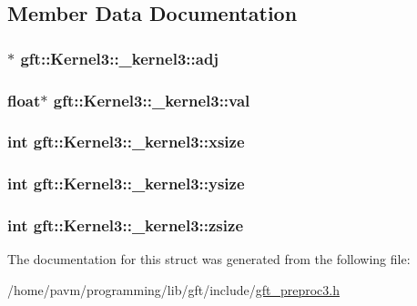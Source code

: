 \subsection{Member Data Documentation}
\hypertarget{structgft_1_1Kernel3_1_1__kernel3_aaca1908dcf4adcb6f2c248d950f89821}{
\subsubsection[{adj}]{$\ast$ gft\-::\-Kernel3\-::\-\_\-kernel3\-::adj}}\label{structgft_1_1Kernel3_1_1__kernel3_aaca1908dcf4adcb6f2c248d950f89821}
\hypertarget{structgft_1_1Kernel3_1_1__kernel3_a2cf5ef95427f4d81f2634a065f69c0af}{
\subsubsection[{val}]{\setlength{\rightskip}{0pt plus 5cm}float$\ast$ gft\-::\-Kernel3\-::\-\_\-kernel3\-::val}}\label{structgft_1_1Kernel3_1_1__kernel3_a2cf5ef95427f4d81f2634a065f69c0af}
\hypertarget{structgft_1_1Kernel3_1_1__kernel3_af168a4a8ef87b8044048f61b7eda1ea6}{
\subsubsection[{xsize}]{\setlength{\rightskip}{0pt plus 5cm}int gft\-::\-Kernel3\-::\-\_\-kernel3\-::xsize}}\label{structgft_1_1Kernel3_1_1__kernel3_af168a4a8ef87b8044048f61b7eda1ea6}
\hypertarget{structgft_1_1Kernel3_1_1__kernel3_a7969c6204643647713a7f57b65a9840d}{
\subsubsection[{ysize}]{\setlength{\rightskip}{0pt plus 5cm}int gft\-::\-Kernel3\-::\-\_\-kernel3\-::ysize}}\label{structgft_1_1Kernel3_1_1__kernel3_a7969c6204643647713a7f57b65a9840d}
\hypertarget{structgft_1_1Kernel3_1_1__kernel3_a4571d07a33802441efb94822dea3d665}{
\subsubsection[{zsize}]{\setlength{\rightskip}{0pt plus 5cm}int gft\-::\-Kernel3\-::\-\_\-kernel3\-::zsize}}\label{structgft_1_1Kernel3_1_1__kernel3_a4571d07a33802441efb94822dea3d665}


The documentation for this struct was generated from the following file\-:\begin{DoxyCompactItemize}
\item 
/home/pavm/programming/lib/gft/include/\hyperlink{gft__preproc3_8h}{gft\-\_\-preproc3.\-h}\end{DoxyCompactItemize}
